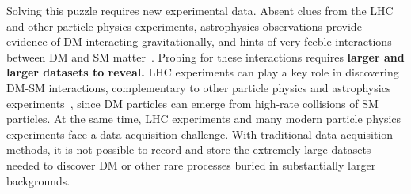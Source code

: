 Solving this puzzle requires new experimental data. 
Absent clues from the LHC and other particle physics experiments, 
astrophysics observations provide evidence of DM interacting gravitationally, and hints of very feeble interactions between DM and SM matter~\cite{Bernal:2017kxu,Steigman:2012nb}. 
Probing for these interactions requires \textbf{larger and larger datasets to reveal.} 
LHC experiments can play a key role in discovering DM-SM interactions, complementary to other particle physics and astrophysics experiments~\cite{Boveia:2018yeb}, since DM particles can emerge from high-rate collisions of SM particles. 
At the same time, LHC experiments and many modern particle physics experiments face a data acquisition challenge.
With traditional data acquisition methods, it is not possible to record and store the extremely large datasets needed to discover DM or other rare processes buried in substantially larger backgrounds. 


